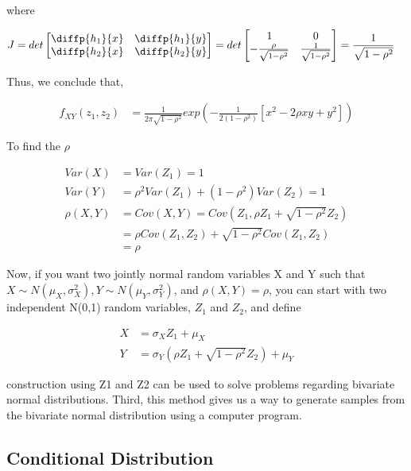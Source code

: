 where 

\begin{align*}
	J &= det \begin{bmatrix}
		\diffp{h_1}{x} & \diffp{h_1}{y} \\
		\diffp{h_2}{x} & \diffp{h_2}{y}
	\end{bmatrix} = det \begin{bmatrix}
	1 & 0 \\
	-\frac{\rho}{\sqrt{1-\rho^2}} & \frac{1}{\sqrt{1-\rho^2}}
\end{bmatrix} = \frac{1}{\sqrt{1-\rho^2}}
\end{align*}

Thus, we conclude that,

\begin{align*}
	f_{XY}(z_1, z_2) &= \frac{1}{2 \pi \sqrt{1-\rho^2}} exp \left( -\frac{1}{2 (1- \rho^2)} [x^2 -2 \rho xy + y^2] \right)
\end{align*}


To find the $\rho$

\begin{align*}
	Var(X) &= Var(Z_1) =1 \\
	Var(Y) &= \rho^2 Var(Z_1) + (1- \rho^2) Var(Z_2) = 1 \\
	\rho(X,Y) &= Cov(X, Y) = Cov(Z_1, \rho Z_1 + \sqrt{1-\rho^2} Z_2) \\
	&= \rho Cov(Z_1, Z_2) + \sqrt{1-\rho^2} Cov(Z_1, Z_2) \\
	&= \rho
\end{align*}

Now, if you want two jointly normal random variables X and Y such that $X \sim N(\mu_X, \sigma^2_X), Y \sim N(\mu_Y, \sigma^2_Y)$, and $\rho(X,Y)= \rho$, you can start with two independent N(0,1) random variables, $Z_1$ and $Z_2$, and define

\begin{align*}
	X &= \sigma_X Z_1 + \mu_X \\
	Y &= \sigma_Y \left(\rho Z_1 + \sqrt{1-\rho^2} Z_2 \right)  + \mu_Y
\end{align*}

construction using Z1 and Z2 can be used to solve problems regarding bivariate normal distributions. Third, this method gives us a way to generate samples from the bivariate normal distribution using a computer program. 


\subsection{Conditional Distribution}

